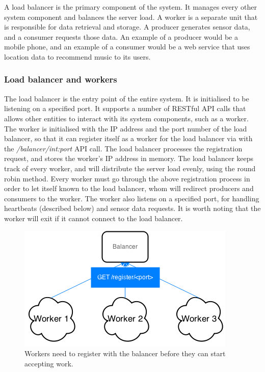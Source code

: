 \documentclass{sigchi}
\begin{document}
A load balancer is the primary component of the system. It manages every other system component and balances the server load. A worker is a separate unit that is responsible for data retrieval and storage. A producer generates sensor data, and a consumer requests those data. An example of a producer would be a mobile phone, and an example of a consumer would be a web service that uses location data to recommend music to its users.

\subsubsection{Load balancer and workers}

The load balancer is the entry point of the entire system. It is initialised to be listening on a specified port. It supports a number of RESTful API calls that allows other entities to interact with its system components, such as a worker. The worker is initialised with the IP address and the port number of the load balancer, so that it can register itself as a worker for the load balancer via with the {\it /balancer/int:port} API call. The load balancer processes the registration request, and stores the worker's IP address in memory. The load balancer keeps track of every worker, and will distribute the server load evenly, using the round robin method. Every worker must go through the above registration process in order to let itself known to the load balancer, whom will redirect producers and consumers to the worker. The worker also listens on a specified port, for handling heartbeats (described below) and sensor data requests. It is worth noting that the worker will exit if it cannot connect to the load balancer.

\begin{figure}[!h]
\centering
\includegraphics[width=0.9\columnwidth]{img/workerreg}
\caption{Workers need to register with the balancer before they can start accepting work.}
\label{fig:worker}
\end{figure}
\end{document}
